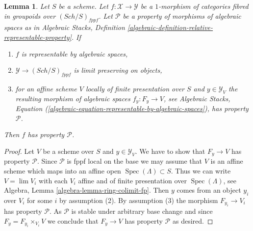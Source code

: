\documentclass{stacks-project}
\theoremstyle{plain}
\newtheorem{lemma}[subsection]{Lemma}
\theoremstyle{definition}
\theoremstyle{remark}
\numberwithin{equation}{subsection}
\def\lim{\mathop{\mathrm{lim}}\nolimits}
\def\Spec{\mathop{\mathrm{Spec}}}
\def\Sch{\mathit{Sch}}
\begin{document}
\begin{lemma}
\label{lemma-check-property-limit-preserving}
Let $S$ be a scheme. Let $f : \mathcal{X} \to \mathcal{Y}$ be a $1$-morphism
of categories fibred in groupoids over $(\Sch/S)_{fppf}$. Let $\mathcal{P}$
be a property of morphisms of algebraic spaces as in
Algebraic Stacks, Definition
\ref{algebraic-definition-relative-representable-property}. If
\begin{enumerate}
\item $f$ is representable by algebraic spaces,
\item $\mathcal{Y} \to (\Sch/S)_{fppf}$ is limit preserving on objects,
\item for an affine scheme $V$ locally of finite presentation over $S$ and
$y \in \mathcal{Y}_V$ the resulting morphism of algebraic spaces
$f_y : F_y \to V$, see Algebraic Stacks, Equation
(\ref{algebraic-equation-representable-by-algebraic-spaces}),
has property $\mathcal{P}$.
\end{enumerate}
Then $f$ has property $\mathcal{P}$.
\end{lemma}

\begin{proof}
Let $V$ be a scheme over $S$ and $y \in \mathcal{Y}_V$. We have to show
that $F_y \to V$ has property $\mathcal{P}$. Since $\mathcal{P}$ is
fppf local on the base we may assume that $V$ is an affine scheme which
maps into an affine open $\Spec(\Lambda) \subset S$. Thus we can write
$V = \lim V_i$ with each $V_i$ affine and of finite presentation over
$\Spec(\Lambda)$, see Algebra, Lemma \ref{algebra-lemma-ring-colimit-fp}.
Then $y$ comes from an object $y_i$ over $V_i$ for some $i$ by assumption (2).
By assumption (3) the morphism $F_{y_i} \to V_i$ has property $\mathcal{P}$.
As $\mathcal{P}$ is stable under arbitrary base change and since
$F_y = F_{y_i} \times_{V_i} V$ we conclude that $F_y \to V$ has property
$\mathcal{P}$ as desired.
\end{proof}
\end{document}
